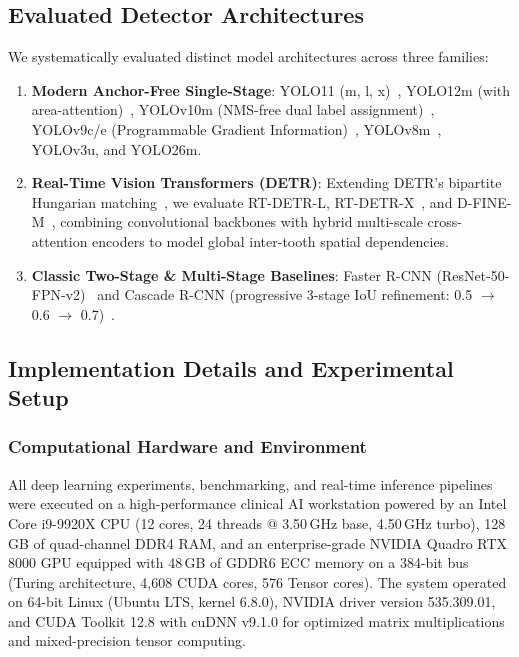 \documentclass[10pt,journal,compsoc]{IEEEtran}
\begin{document}
\subsection{Evaluated Detector Architectures}
We systematically evaluated distinct model architectures across three families:
\begin{enumerate}
    \item \textbf{Modern Anchor-Free Single-Stage}: YOLO11 (m, l, x)~\cite{ultralytics2024}, YOLO12m (with area-attention)~\cite{tian2025yolo12}, YOLOv10m (NMS-free dual label assignment)~\cite{wang2024yolov10}, YOLOv9c/e (Programmable Gradient Information)~\cite{wang2024yolov9}, YOLOv8m~\cite{yolov8}, YOLOv3u, and YOLO26m.
    \item \textbf{Real-Time Vision Transformers (DETR)}: Extending DETR's bipartite Hungarian matching~\cite{carion2020detr}, we evaluate RT-DETR-L, RT-DETR-X~\cite{lv2023detr}, and D-FINE-M~\cite{peng2024dfine}, combining convolutional backbones with hybrid multi-scale cross-attention encoders to model global inter-tooth spatial dependencies.
    \item \textbf{Classic Two-Stage \& Multi-Stage Baselines}: Faster R-CNN (ResNet-50-FPN-v2)~\cite{ren2015faster} and Cascade R-CNN (progressive 3-stage IoU refinement: 0.5 $\rightarrow$ 0.6 $\rightarrow$ 0.7)~\cite{cai2018cascade}.
\end{enumerate}

\subsection{Implementation Details and Experimental Setup}
\label{sec:implementation_details}
\subsubsection{Computational Hardware and Environment}
All deep learning experiments, benchmarking, and real-time inference pipelines were executed on a high-performance clinical AI workstation powered by an Intel Core i9-9920X CPU (12 cores, 24 threads @ 3.50\,GHz base, 4.50\,GHz turbo), 128\,GB of quad-channel DDR4 RAM, and an enterprise-grade NVIDIA Quadro RTX 8000 GPU equipped with 48\,GB of GDDR6 ECC memory on a 384-bit bus (Turing architecture, 4,608 CUDA cores, 576 Tensor cores). The system operated on 64-bit Linux (Ubuntu LTS, kernel 6.8.0), NVIDIA driver version 535.309.01, and CUDA Toolkit 12.8 with cuDNN v9.1.0 for optimized matrix multiplications and mixed-precision tensor computing.
\end{document}
